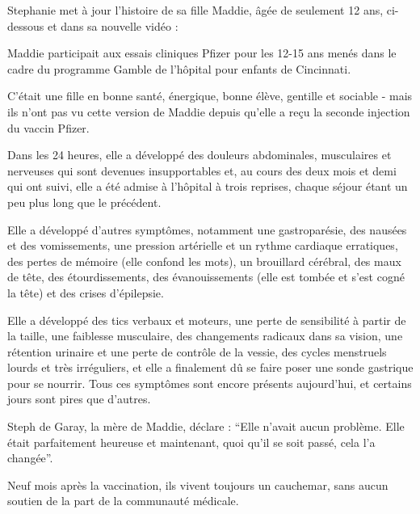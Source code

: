 Stephanie met à jour l'histoire de sa fille Maddie, âgée de seulement 12 ans,
ci-dessous et dans sa nouvelle vidéo :

Maddie participait aux essais cliniques Pfizer pour les 12-15 ans menés dans le
cadre du programme Gamble de l'hôpital pour enfants de Cincinnati.

C'était une fille en bonne santé, énergique, bonne élève, gentille et sociable -
mais ils n'ont pas vu cette version de Maddie depuis qu'elle a reçu la seconde
injection du vaccin Pfizer.

Dans les 24 heures, elle a développé des douleurs abdominales, musculaires et
nerveuses qui sont devenues insupportables et, au cours des deux mois et demi
qui ont suivi, elle a été admise à l'hôpital à trois reprises, chaque séjour
étant un peu plus long que le précédent.

Elle a développé d'autres symptômes, notamment une gastroparésie, des nausées et
des vomissements, une pression artérielle et un rythme cardiaque erratiques, des
pertes de mémoire (elle confond les mots), un brouillard cérébral, des maux de
tête, des étourdissements, des évanouissements (elle est tombée et s'est cogné
la tête) et des crises d'épilepsie.

Elle a développé des tics verbaux et moteurs, une perte de sensibilité à partir
de la taille, une faiblesse musculaire, des changements radicaux dans sa vision,
une rétention urinaire et une perte de contrôle de la vessie, des cycles
menstruels lourds et très irréguliers, et elle a finalement dû se faire poser
une sonde gastrique pour se nourrir. Tous ces symptômes sont encore présents
aujourd'hui, et certains jours sont pires que d'autres.

Steph de Garay, la mère de Maddie, déclare : “Elle n'avait aucun problème. Elle
était parfaitement heureuse et maintenant, quoi qu'il se soit passé, cela l'a
changée”.

Neuf mois après la vaccination, ils vivent toujours un cauchemar, sans aucun
soutien de la part de la communauté médicale.
